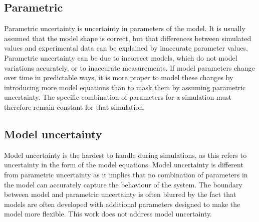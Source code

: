 \subsection{Parametric}
Parametric uncertainty is uncertainty in parameters of the model.  
It is usually assumed that the model shape is correct, but that differences between simulated values and experimental data can be explained by inaccurate parameter values.  
Parametric uncertainty can be due to incorrect models, which do not model variations accurately, or to inaccurate measurements.  
If model parameters change over time in predictable ways, it is more proper to model these changes by introducing more model equations than to mask them by assuming parametric uncertainty.  
The specific combination of parameters for a simulation must therefore remain constant for that simulation.

\subsection{Model uncertainty}
Model uncertainty is the hardest to handle during simulations, as this refers to uncertainty in the form of the model equations.  
Model uncertainty is different from parametric uncertainty as it implies that no combination of parameters in the model can accurately capture the behaviour of the system.  
The boundary between model and parametric uncertainty is often blurred by the fact that models are often developed with additional parameters designed to make the model more flexible.  
This work does not address model uncertainty.

